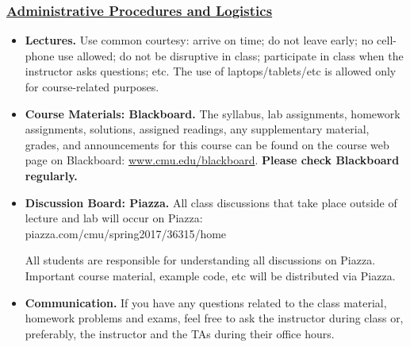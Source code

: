 \documentclass[11pt]{article}
\begin{document}
\subsubsection*{\underline{Administrative Procedures and Logistics}}
\begin{itemize}
\item {\bf Lectures.} Use common courtesy: arrive on time; do not leave early; no cell-phone use allowed; do not be disruptive in class; participate in class when the instructor asks questions; etc.  The  use of laptops/tablets/etc is allowed only for course-related purposes.
    
\item {\bf Course Materials:  Blackboard.} The syllabus, lab assignments, homework assignments, solutions, assigned readings, any supplementary material, grades, and announcements for this course can be found on the course web page on Blackboard:  \url{www.cmu.edu/blackboard}.  {\bf Please check Blackboard regularly.}

\item {\bf Discussion Board:  Piazza.} All class discussions that take place outside of lecture and lab will occur on Piazza:  piazza.com/cmu/spring2017/36315/home

All students are responsible for understanding all discussions on Piazza.  Important course material, example code, etc will be distributed via Piazza.



\item {\bf Communication.} If you have any questions related to the class material, homework problems and exams, feel free to ask the instructor during class or, preferably, the instructor and the TAs during their office hours. 


\end{itemize}
\end{document}
